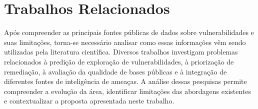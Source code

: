 \section{Trabalhos Relacionados}

Após compreender as principais fontes públicas de dados sobre vulnerabilidades e suas limitações, torna-se necessário analisar como essas informações vêm sendo utilizadas pela literatura científica. Diversos trabalhos investigam problemas relacionados à predição de exploração de vulnerabilidades, à priorização de remediação, à avaliação da qualidade de bases públicas e à integração de diferentes fontes de inteligência de ameaças. A análise dessas pesquisas permite compreender a evolução da área, identificar limitações das abordagens existentes e contextualizar a proposta apresentada neste trabalho.




